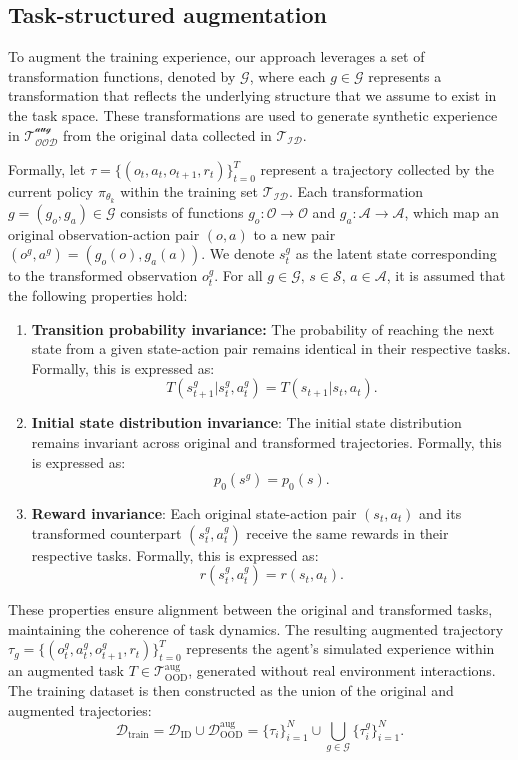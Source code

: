 \subsection{Task-structured augmentation}
To augment the training experience, our approach leverages a set of transformation functions, denoted by \( \mathcal{G} \), where each \( g \in \mathcal{G} \) represents a transformation that reflects the underlying structure that we assume to exist in the task space.
These transformations are used to generate synthetic experience in \( \mathcal{T_{\text{OOD}}^{\text{aug}}} \) from the original data collected in \( \mathcal{T_{\text{ID}}} \).

Formally, let \( \tau = \{(o_t, a_t, o_{t+1}, r_t)\}_{t=0}^{T} \) represent a trajectory collected by the current policy \( \pi_{\theta_k} \) within the training set \( \mathcal{T_{\text{ID}}} \). 
Each transformation \( g = (g_o, g_a) \in \mathcal{G} \) consists of functions \( g_o : \mathcal{O} \rightarrow \mathcal{O} \) and \( g_a : \mathcal{A} \rightarrow \mathcal{A} \), which map an original observation-action pair \( (o, a) \) to a new pair \( (o^g, a^g) = (g_o(o), g_a(a)) \).
We denote \( s_t^g\) as the latent state corresponding to the transformed observation \( o_t^g\).
For all \( g \in \mathcal{G}, \, s \in \mathcal{S}, \, a \in \mathcal{A}\), it is assumed that the following properties hold:
\begin{enumerate}[label=(\alph*)]
    \item \label{item:transition_invariance} \textbf{Transition probability invariance:} The probability of reaching the next state from a given state-action pair remains identical in their respective tasks. Formally, this is expressed as:
    \[
    T(s_{t+1}^g | s_t^g, a_t^g) = T(s_{t+1} | s_t, a_t).
    \]
    \item \label{item:init_state_invariance} \textbf{Initial state distribution invariance}: The initial state distribution remains invariant across original and transformed trajectories. Formally, this is expressed as:
    \[
    p_0(s^g) = p_0(s).
    \]
    \item \label{item:reward_invariance} \textbf{Reward invariance}: Each original state-action pair \( (s_t, a_t) \) and its transformed counterpart \( (s_t^g, a_t^g) \) receive the same rewards in their respective tasks. Formally, this is expressed as:
    \[
    r(s_t^g, a_t^g) = r(s_t, a_t).
    \]
\end{enumerate}
These properties ensure alignment between the original and transformed tasks, maintaining the coherence of task dynamics. 
The resulting augmented trajectory \( \tau_g = \{(o_t^g, a_t^g, o_{t+1}^g, r_t)\}_{t=0}^{T} \) represents the agent’s simulated experience within an augmented task \( T \in \mathcal{T}_{\text{OOD}}^{\text{aug}} \), generated without real environment interactions.
The training dataset is then constructed as the union of the original and augmented trajectories:
\[
\mathcal{D}_{\text{train}} = \mathcal{D}_{\text{ID}} \cup \mathcal{D}_{\text{OOD}}^{\text{aug}} = \{\tau_i\}_{i=1}^N \cup \bigcup_{g \in \mathcal{G}} \{\tau_i^g\}_{i=1}^N.
\]

